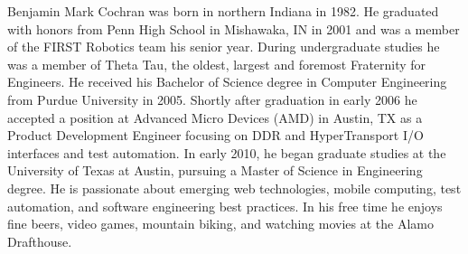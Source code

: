 \documentclass[12pt]{report}	%
\theoremstyle{definition}
\theoremstyle{remark}
\begin{document}



\begin{vita}
Benjamin Mark Cochran was born in northern Indiana in 1982. He graduated
with honors from Penn High School in Mishawaka, IN in 2001 and was a
member of the FIRST Robotics team his senior year. During undergraduate
studies he was a member of Theta Tau, the oldest, largest and foremost
Fraternity for Engineers. He received his Bachelor of Science degree in
Computer Engineering from Purdue University in 2005. Shortly after
graduation in early 2006 he accepted a position at Advanced Micro
Devices (AMD) in Austin, TX as a Product Development Engineer focusing
on DDR and HyperTransport I/O interfaces and test automation. In early
2010, he began graduate studies at the University of Texas at Austin,
pursuing a Master of Science in Engineering degree. He is passionate
about emerging web technologies, mobile computing, test automation, and
software engineering best practices. In his free time he enjoys fine
beers, video games, mountain biking, and watching movies at the Alamo
Drafthouse.
\end{vita}
\end{document}
